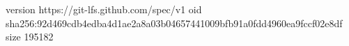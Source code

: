 version https://git-lfs.github.com/spec/v1
oid sha256:92d469cdb4edba4d1ae2a8a03b04657441009bfb91a0fdd4960ea9fccf02e8df
size 195182
